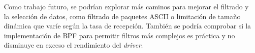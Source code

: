 \documentclass[oneside, draft]{epstfg}
\begin{document}
Como trabajo futuro, se podrían explorar más caminos para mejorar el filtrado y la selección de datos, como filtrado de paquetes ASCII \cite{ucedaselective} o limitación de tamaño dinámica que varíe según la tasa de recepción. También se podría comprobar si la implementación de \gls{BPF} para permitir filtros más complejos es práctica y no disminuye en exceso el rendimiento del \textit{driver}.

\backmatter
\appendix

\printnoidxglossaries
\cleardoublepage

\nocite{*}
{}

\cleardoublepage
\printindex
\end{document}
